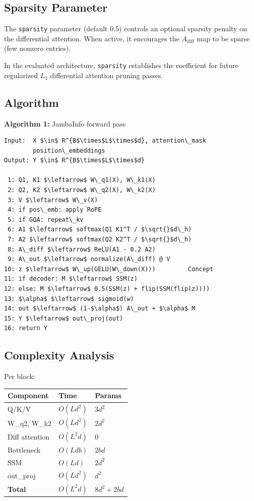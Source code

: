 \subsection{Sparsity Parameter}

The \texttt{sparsity} parameter (default 0.5) controls an optional sparsity 
penalty on the differential attention. When active, it encourages the 
$A_\text{diff}$ map to be sparse (few nonzero entries).

In the evaluated architecture, \texttt{sparsity} establishes the coefficient for future regularized $L_1$ differential attention pruning passes.

\subsection{Algorithm}

\textbf{Algorithm 1:} JambaInfo forward pass
\begin{lstlisting}
Input:  X $\in$ R^{B$\times$L$\times$d}, attention\_mask
        position\_embeddings
Output: Y $\in$ R^{B$\times$L$\times$d}

 1: Q1, K1 $\leftarrow$ W\_q1(X), W\_k1(X)
 2: Q2, K2 $\leftarrow$ W\_q2(X), W\_k2(X)
 3: V $\leftarrow$ W\_v(X)
 4: if pos\_emb: apply RoPE
 5: if GQA: repeat\_kv
 6: A1 $\leftarrow$ softmax(Q1 K1^T / $\sqrt{}$d\_h)
 7: A2 $\leftarrow$ softmax(Q2 K2^T / $\sqrt{}$d\_h)
 8: A\_diff $\leftarrow$ ReLU(A1 - 0.2 A2)
 9: A\_out $\leftarrow$ normalize(A\_diff) @ V
10: z $\leftarrow$ W\_up(GELU(W\_down(X)))         Concept
11: if decoder: M $\leftarrow$ SSM(z)
12: else: M $\leftarrow$ 0.5(SSM(z) + flip(SSM(flip(z))))
13: $\alpha$ $\leftarrow$ sigmoid(w)
14: out $\leftarrow$ (1-$\alpha$) A\_out + $\alpha$ M
15: Y $\leftarrow$ out\_proj(out)
16: return Y
\end{lstlisting}

\subsection{Complexity Analysis}

Per block:

\begin{table}[H]
\centering
\small
\begin{tabular}{lll}
\toprule
\textbf{Component} & \textbf{Time} & \textbf{Params} \\
\midrule
Q/K/V & $O(L d^2)$ & $3 d^2$ \\
W\_q2, W\_k2 & $O(L d^2)$ & $2 d^2$ \\
Diff attention & $O(L^2 d)$ & 0 \\
Bottleneck & $O(L d b)$ & $2 b d$ \\
SSM & $O(L d)$ & $2 d^2$ \\
out\_proj & $O(L d^2)$ & $d^2$ \\
\textbf{Total} & $O(L^2 d)$ & $8 d^2 + 2bd$ \\
\bottomrule
\end{tabular}
\end{table}

